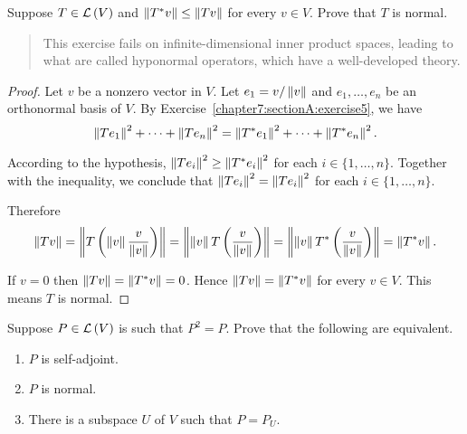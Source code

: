 \begin{exercise}
    Suppose $T\in\mathcal{L}\left({V}\right)$ and $\left\Vert{T^{*}v}\right\Vert \leq \left\Vert{Tv}\right\Vert$ for every $v\in V$. Prove that $T$ is normal.
\end{exercise}

\begin{quote}
    This exercise fails on infinite-dimensional inner product spaces, leading to what are called hyponormal operators, which have a well-developed theory.
\end{quote}

\begin{proof}
    Let $v$ be a nonzero vector in $V$. Let $e_{1} = v/\left\Vert{v}\right\Vert$ and $e_{1}, \ldots, e_{n}$ be an orthonormal basis of $V$. By Exercise~\ref{chapter7:sectionA:exercise5}, we have
    \[
        \left\Vert{Te_{1}}\right\Vert^{2} + \cdots + \left\Vert{Te_{n}}\right\Vert^{2} = \left\Vert{T^{*}e_{1}}\right\Vert^{2} + \cdots + \left\Vert{T^{*}e_{n}}\right\Vert^{2}.
    \]

    According to the hypothesis, $\left\Vert{Te_{i}}\right\Vert^{2}\geq \left\Vert{T^{*}e_{i}}\right\Vert^{2}$ for each $i\in\{1,\ldots, n\}$. Together with the inequality, we conclude that $\left\Vert{Te_{i}}\right\Vert^{2} = \left\Vert{Te_{i}}\right\Vert^{2}$ for each $i\in\{1,\ldots, n\}$.

    Therefore
    \[
        \left\Vert{Tv}\right\Vert = \left\Vert{T\left(\left\Vert{v}\right\Vert\frac{v}{\left\Vert{v}\right\Vert}\right)}\right\Vert = \left\Vert{\left\Vert{v}\right\Vert T\left(\frac{v}{\left\Vert{v}\right\Vert}\right)}\right\Vert = \left\Vert{\left\Vert{v}\right\Vert T^{*}\left(\frac{v}{\left\Vert{v}\right\Vert}\right)}\right\Vert = \left\Vert{T^{*}v}\right\Vert.
    \]

    If $v = 0$ then $\left\Vert{Tv}\right\Vert = \left\Vert{T^{*}v}\right\Vert = 0$. Hence $\left\Vert{Tv}\right\Vert = \left\Vert{T^{*}v}\right\Vert$ for every $v\in V$. This means $T$ is normal.
\end{proof}
\newpage

\begin{exercise}
    Suppose $P\in\mathcal{L}\left({V}\right)$ is such that $P^{2} = P$. Prove that the following are equivalent.
    \begin{enumerate}[label={(\alph*)}]
        \item $P$ is self-adjoint.
        \item $P$ is normal.
        \item There is a subspace $U$ of $V$ such that $P = P_{U}$.
    \end{enumerate}
\end{exercise}


